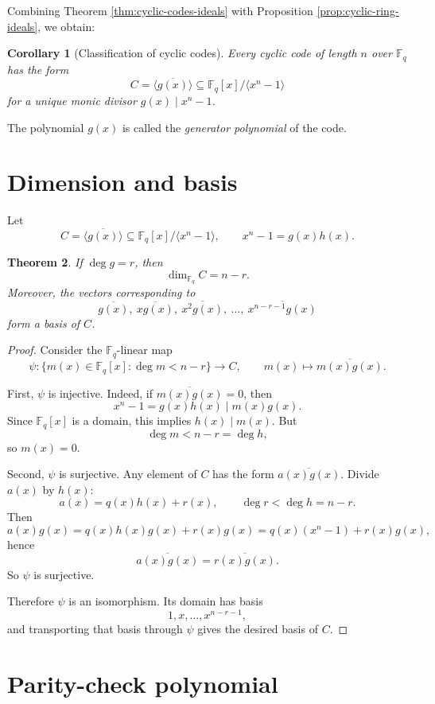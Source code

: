 \documentclass[11pt]{article}
\newtheorem{theorem}{Theorem}[section]
\newtheorem{corollary}[theorem]{Corollary}
\theoremstyle{definition}
\newcommand{\F}{\mathbb{F}}
\newcommand{\ideal}[1]{\langle #1\rangle}
\newcommand{\ol}[1]{\overline{#1}}
\begin{document}
	Combining Theorem \ref{thm:cyclic-codes-ideals} with Proposition \ref{prop:cyclic-ring-ideals}, we obtain:
	
	\begin{corollary}[Classification of cyclic codes]
		Every cyclic code of length \(n\) over \(\F_q\) has the form
		\[
		C=\ideal{\ol{g(x)}}\subseteq \F_q[x]/\ideal{x^n-1}
		\]
		for a unique monic divisor \(g(x)\mid x^n-1\).
	\end{corollary}
	
	The polynomial \(g(x)\) is called the \emph{generator polynomial} of the code.
	
	\section{Dimension and basis}
	
	Let
	\[
	C=\ideal{\ol{g(x)}}\subseteq \F_q[x]/\ideal{x^n-1},
	\qquad
	x^n-1=g(x)h(x).
	\]
	
	\begin{theorem}\label{thm:dimension}
		If \(\deg g=r\), then
		\[
		\dim_{\F_q} C = n-r.
		\]
		Moreover, the vectors corresponding to
		\[
		\ol{g(x)},\ \ol{xg(x)},\ \ol{x^2g(x)},\ \dots,\ \ol{x^{n-r-1}g(x)}
		\]
		form a basis of \(C\).
	\end{theorem}
	
	\begin{proof}
		Consider the \(\F_q\)-linear map
		\[
		\psi:\{m(x)\in \F_q[x]: \deg m<n-r\}\to C,
		\qquad
		m(x)\mapsto \ol{m(x)g(x)}.
		\]
		
		First, \(\psi\) is injective. Indeed, if \(\ol{m(x)g(x)}=0\), then
		\[
		x^n-1=g(x)h(x)\mid m(x)g(x).
		\]
		Since \(\F_q[x]\) is a domain, this implies \(h(x)\mid m(x)\). But
		\[
		\deg m < n-r = \deg h,
		\]
		so \(m(x)=0\).
		
		Second, \(\psi\) is surjective. Any element of \(C\) has the form \(\ol{a(x)g(x)}\). Divide \(a(x)\) by \(h(x)\):
		\[
		a(x)=q(x)h(x)+r(x),
		\qquad
		\deg r<\deg h=n-r.
		\]
		Then
		\[
		a(x)g(x)=q(x)h(x)g(x)+r(x)g(x)=q(x)(x^n-1)+r(x)g(x),
		\]
		hence
		\[
		\ol{a(x)g(x)}=\ol{r(x)g(x)}.
		\]
		So \(\psi\) is surjective.
		
		Therefore \(\psi\) is an isomorphism. Its domain has basis
		\[
		1,x,\dots,x^{n-r-1},
		\]
		and transporting that basis through \(\psi\) gives the desired basis of \(C\).
	\end{proof}
	
	\section{Parity-check polynomial}
	
\end{document}
